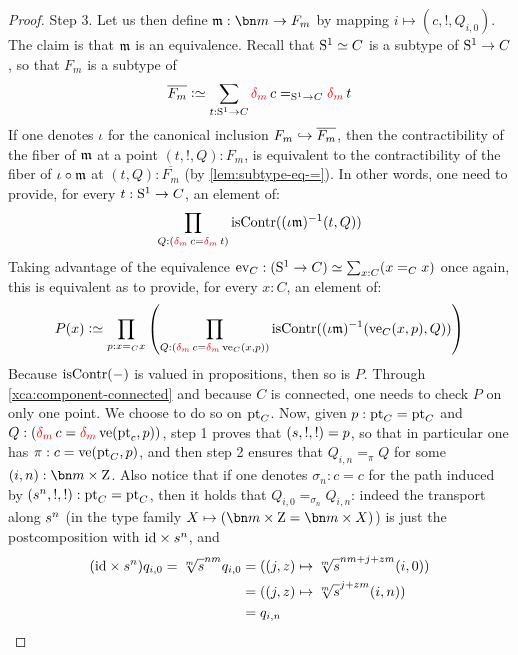 \begin{proof}
  {\sc Step 3.} Let us then define $\myq: \bn m \to F_m$ by mapping
  $i \mapsto (c,!,Q_{i,0})$. The claim is that $\mathfrak m$ is an
  equivalence. Recall that ${\mathrm{S}^1} \simeq C$ is a subtype of ${\mathrm{S}^1} \to C$,
  so that $F_m$ is a subtype of
  \begin{displaymath}
    \overline {F_m} \defequi \sum_{t:\Sc \to C}\dg{m}c=_{\Sc\to C}\dg{m}t
  \end{displaymath}
  If one denotes $\iota$ for the canonical inclusion
  $F_m\hookrightarrow \overline{F_m}$, then the contractibility of the fiber of
  $\mathfrak m$ at a point $(t,!,Q):F_m$, is equivalent to the
  contractibility of the fiber of $\iota\circ\mathfrak m$ at
  $(t,Q):\overline{F_m}$ (by \cref{lem:subtype-eq-=}).  In other
  words, one need to provide, for every $t:{\mathrm{S}^1} \to C$, an element of:
  \begin{displaymath}
    \prod_{Q:(\dg{m}c=\dg{m}t)} \iscontr(\inv {(\iota \myq)} (t,Q)) 
  \end{displaymath}
  Taking advantage of the equivalence
  $\ev_C: (\Sc \to C) \weq \sum_{x:C}(x=_Cx)$ once again, this is
  equivalent as to provide, for every $x:C$, an element of:
  \begin{displaymath}
    P(x) \defequi \prod_{p:x=_Cx}
    \left(
      \prod_{Q:(\dg{m}c=\dg{m}\ve_C(x,p))} \iscontr(\inv {(\iota \myq)} (\ve_C(x,p),Q))
    \right) 
  \end{displaymath}
  Because $\mathrm{isContr}({-})$ is valued in propositions, then so is
  $P$. Through \cref{xca:component-connected} and because $C$ is
  connected, one needs to check $P$ on only one point. We choose to do
  so on $\mathrm{pt}_C$. Now, given $p:\mathrm{pt}_C = \mathrm{pt}_C$ and
  $Q:(\dg{m}c=\dg{m}\ve(\pt_c,p))$, step 1 proves that
  $({s}, !,!)=p$, so that in particular one has
  $\pi:c=\ve(\pt_C,p)$, and then step 2 ensures that $Q_{i,n}=_\pi Q$
  for some $(i,n):\bn m \times \zet$. Also notice that if one denotes
  $\sigma_n:c = c$ for the path induced by $({s}^n,!,!): \mathrm{pt}_C=\mathrm{pt}_C$,
  then it holds that $Q_{i,0}=_{\sigma_n}Q_{i,n}$: indeed the
  transport along ${s}^n$ (in the type family
  $X \mapsto (\bn m\times \zet = \bn m\times X)$) is just the
  postcomposition with $\mathord{\mathrm{id}} \times {s}^n$, and
  \begin{displaymath}
    \begin{split}
      (\id\times s^n) q_{i,0} = \sqrt[m]s^{nm}q_{i,0} &= ((j,z)\mapsto \sqrt[m]s^{nm+j+zm}(i,0))\\
      &= ((j,z)\mapsto \sqrt[m]s^{j+zm}(i,n)) \\
      &= q_{i,n}
    \end{split}

\end{displaymath}
\end{proof}
